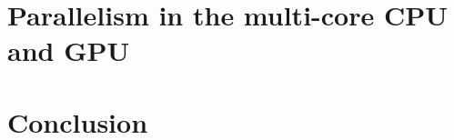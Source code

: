 \documentclass[a4paper,11pt]{article}
\begin{document}




\section{Parallelism in the multi-core CPU and GPU} %
\label{sec:parallelism_in_the_multi_core_cpu_and_gpu}



\section{Conclusion} %
\label{sec:conclusion}





\end{document}
